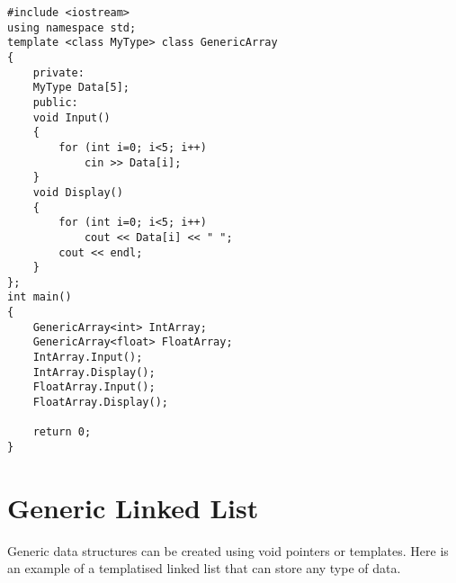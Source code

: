 \documentclass[12pt,a4paper]{article}
\begin{document}
\begin{lstlisting}[caption={Class template}]
#include <iostream>
using namespace std;
template <class MyType> class GenericArray
{
	private:
	MyType Data[5];
	public:
	void Input()
	{
		for (int i=0; i<5; i++)
			cin >> Data[i];
	}
	void Display()
	{
		for (int i=0; i<5; i++)
			cout << Data[i] << " ";
		cout << endl;
	}
};
int main()
{
	GenericArray<int> IntArray;
	GenericArray<float> FloatArray;
	IntArray.Input();
	IntArray.Display();
	FloatArray.Input();
	FloatArray.Display();
	
	return 0;
}
\end{lstlisting}
\newpage
\section{Generic Linked List}
Generic data structures can be created using void pointers or templates. Here is an example of a templatised linked list that can store any type of data.
\end{document}
